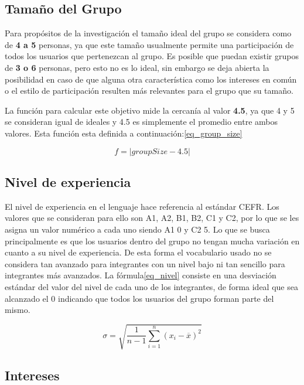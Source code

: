\subsection{Tamaño del Grupo}

Para propósitos de la investigación el tamaño ideal del grupo se considera como de \textbf{4 a 5} personas, ya que este tamaño usualmente permite una participación de todos los usuarios que pertenezcan al grupo. Es posible que puedan existir grupos de \textbf{3 o 6} personas, pero esto no es lo ideal, sin embargo se deja abierta la posibilidad en caso de que alguna otra característica como los intereses en común o el estilo de participación resulten más relevantes para el grupo que su tamaño.

La función para calcular este objetivo mide la cercanía al valor \textbf{4.5}, ya que 4 y 5 se consideran igual de ideales y 4.5 es simplemente el promedio entre ambos valores. Esta función esta definida a continuación:\ref{eq_group_size}

\begin{equation} \label{eq_group_size}
    f = | groupSize - 4.5|
\end{equation}

\subsection{Nivel de experiencia}

El nivel de experiencia en el lenguaje hace referencia al estándar CEFR\cite{}. Los valores que se consideran para ello son A1, A2, B1, B2, C1 y C2, por lo que se les asigna un valor numérico a cada uno siendo A1 0 y C2 5. Lo que se busca principalmente es que los usuarios dentro del grupo no tengan mucha variación en cuanto a su nivel de experiencia. De esta forma el vocabulario usado no se considera tan avanzado para integrantes con un nivel bajo ni tan sencillo para integrantes más avanzados. La fórmula\ref{eq_nivel} consiste en una desviación estándar del valor del nivel de cada uno de los integrantes, de forma ideal que sea alcanzado el 0 indicando que todos los usuarios del grupo forman parte del mismo.

\begin{equation} \label{eq_nivel}
    \sigma = \sqrt{\frac{1}{n-1} \sum_{i=1}^n (x_i - \overline{x})^2}
\end{equation}

\subsection{Intereses}

